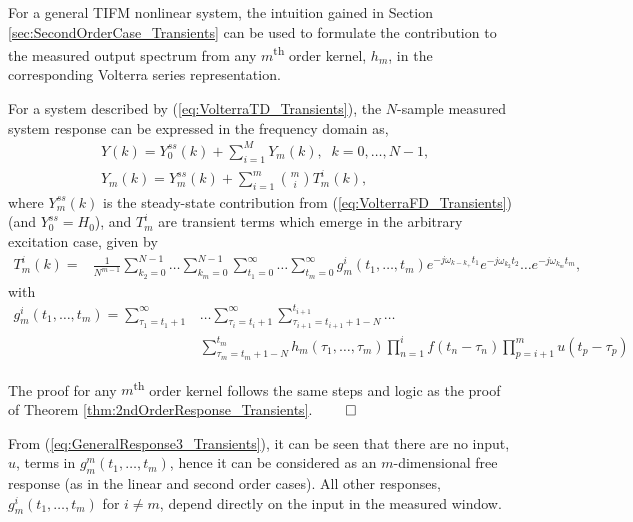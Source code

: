 For a general TIFM nonlinear system, the intuition gained in Section \ref{sec:SecondOrderCase_Transients} can be used to formulate the contribution to the measured output spectrum from any $m$\textsuperscript{th} order kernel, $h_m$, in the corresponding Volterra series representation.
\begin{thm}
\label{thm:GeneralResponse_Transients}
For a system described by (\ref{eq:VolterraTD_Transients}), the $N$-sample measured system response can be expressed in the frequency domain as,
\begin{equation}
\begin{aligned}
\label{eq:GeneralResponse1_Transients}
&Y(k) = Y_0^{ss}(k) + \sum_{i=1}^{M} Y_m(k), \; \; k = 0,\hdots,N-1,\\
&Y_m(k) = Y_m^{ss}(k) + \sum_{i=1}^{m} \binom{m}{i} T_m^i(k),
\end{aligned}
\end{equation}
where $Y_m^{ss}(k)$ is the steady-state contribution from (\ref{eq:VolterraFD_Transients}) (and $Y_0^{ss} = H_0$), and $T_m^i$ are transient terms which emerge in the arbitrary excitation case, given by
\begin{equation}
\begin{aligned}
\label{eq:GeneralResponse2_Transients}
T_m^i(k) = &\frac{1}{N^{m-1}} \sum_{k_2=0}^{N-1} \hdots \sum_{k_{m}=0}^{N-1} \sum_{t_1=0}^{\infty} \hdots \sum_{t_m=0}^{\infty} g_m^i(t_1,\hdots,t_m) e^{-j\omega_{k-k_+}t_1} e^{-j\omega_{k_2}t_2} \hdots e^{-j\omega_{k_{m}}t_{m}},
\end{aligned}
\end{equation}
with
\begin{equation}
\begin{split}
\label{eq:GeneralResponse3_Transients}
g_m^i(t_1,\hdots,t_m) = \sum_{\tau_1=t_1+1}^{\infty} &\hdots \sum_{\tau_{i}=t_i+1}^{\infty} \sum_{\tau_{i+1}=t_{i+1}+1-N}^{t_{i+1}} \hdots \\ 
&\sum_{\tau_m=t_m+1-N}^{t_m} h_m(\tau_1,\hdots,\tau_m) \prod_{n=1}^{i}f(t_n-\tau_n)\prod_{p=i+1}^{m}u(t_p-\tau_p)
\end{split}
\end{equation}
\end{thm}
\begin{proof*}
The proof for any $m$\textsuperscript{th} order kernel follows the same steps and logic as the proof of Theorem \ref{thm:2ndOrderResponse_Transients}. \hfill $\qed$
\end{proof*}

From (\ref{eq:GeneralResponse3_Transients}), it can be seen that there are no input, $u$, terms in $g_m^m(t_1,\hdots,t_m)$, hence it can be considered as an $m$-dimensional free response (as in the linear and second order cases). All other responses, $g_m^i(t_1,\hdots,t_m)$ for $i \neq m$, depend directly on the input in the measured window. 

